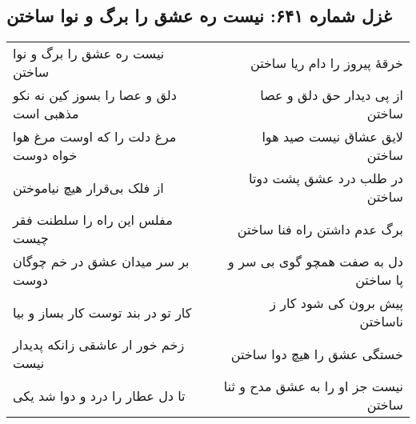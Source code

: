 \begin{center}
\section*{غزل شماره ۶۴۱: نیست ره عشق را برگ و نوا ساختن}
\label{sec:641}
\begin{longtable}{l p{0.5cm} r}
نیست ره عشق را برگ و نوا ساختن
&&
خرقهٔ پیروز را دام ریا ساختن
\\
دلق و عصا را بسوز کین نه نکو مذهبی است
&&
از پی دیدار حق دلق و عصا ساختن
\\
مرغ دلت را که اوست مرغ هوا خواه دوست
&&
لایق عشاق نیست صید هوا ساختن
\\
از فلک بی‌قرار هیچ نیاموختن
&&
در طلب درد عشق پشت دوتا ساختن
\\
مفلس این راه را سلطنت فقر چیست
&&
برگ عدم داشتن راه فنا ساختن
\\
بر سر میدان عشق در خم چوگان دوست
&&
دل به صفت همچو گوی بی سر و پا ساختن
\\
کار تو در بند توست کار بساز و بیا
&&
پیش برون کی شود کار ز ناساختن
\\
زخم خور ار عاشقی زانکه پدیدار نیست
&&
خستگی عشق را هیچ دوا ساختن
\\
تا دل عطار را درد و دوا شد یکی
&&
نیست جز او را به عشق مدح و ثنا ساختن
\\
\end{longtable}
\end{center}
